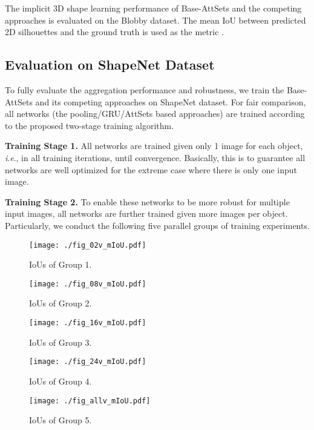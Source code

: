 \documentclass[twocolumn]{svjour3}    \pdfoutput=1
\newcommand{\nickname}{AttSets}
\newcommand{\ie}{\textit{i}.\textit{e}., }
\newcommand{\rev}{}
\begin{document}
The implicit 3D shape learning performance of Base-AttSets and the competing approaches is evaluated on the Blobby dataset. The mean IoU between predicted 2D silhouettes and the ground truth is used as the metric \citep{Wiles2017}.

\subsection{Evaluation on ShapeNet Dataset}\label{sec:eval_r2n2}
To fully evaluate the aggregation performance and robustness, we train the Base-AttSets and its competing approaches on ShapeNet dataset. For fair comparison, all networks \rev{(the pooling/GRU/\nickname{} based approaches)} are trained according to the proposed two-stage training algorithm.

\textbf{Training Stage 1.} All networks are trained given only 1 image for each object, \ie  in all training iterations, until convergence. Basically, this is to guarantee all networks are well optimized for the extreme case where there is only one input image.

\textbf{Training Stage 2.} To enable these networks to be more robust for multiple input images, all networks are further trained given more images per object. Particularly, we conduct the following five parallel groups of training experiments.

\begin{figure*}[!h]
	\setlength{\abovecaptionskip}{0 cm}
	\setlength{\belowcaptionskip}{-8pt}
	\begin{minipage}[t]{0.19\textwidth}
		\centerline{
			\texttt{[image: ./fig\_02v\_mIoU.pdf]}}
		\caption{IoUs of Group 1.}
		\label{fig:02v_mIoU}
	\end{minipage}
	\makebox[0.02in][]{}
	\begin{minipage}[t]{0.19\textwidth}
		\centerline{
			\texttt{[image: ./fig\_08v\_mIoU.pdf]}}
		\caption{IoUs of Group 2.}
        \label{fig:08v_mIoU}
	\end{minipage}
	\makebox[0.02in][]{}
	\begin{minipage}[t]{0.19\textwidth}
		\centerline{
			\texttt{[image: ./fig\_16v\_mIoU.pdf]}}
		\caption{IoUs of Group 3.}
        \label{fig:16v_mIoU}
	\end{minipage}
    \makebox[0.02in][]{}
	\begin{minipage}[t]{0.19\textwidth}
		\centerline{
			\texttt{[image: ./fig\_24v\_mIoU.pdf]}}
		\caption{IoUs of Group 4.}
        \label{fig:24v_mIoU}
	\end{minipage}
	\makebox[0.02in][]{}
	\begin{minipage}[t]{0.19\textwidth}
		\centerline{
			\texttt{[image: ./fig\_allv\_mIoU.pdf]}}
		\caption{\scriptsize{IoUs of Group} 5.}
        \label{fig:allv_mIoU}
	\end{minipage}
\vspace{-0.4cm}
\end{figure*}
\end{document}
